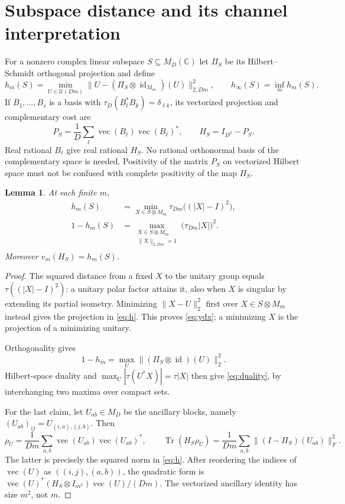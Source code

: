 \documentclass[11pt,a4paper]{article}
\newtheorem{lemma}[theorem]{Lemma}
\newcommand{\C}{\mathbb C}
\newcommand{\Tr}{\operatorname{Tr}}
\newcommand{\id}{\operatorname{id}}
\newcommand{\vecop}{\operatorname{vec}}
\newcommand{\norm}[1]{\lVert#1\rVert}
\begin{document}
\section{Subspace distance and its channel interpretation}
For a nonzero complex linear subspace $S\subseteq M_D(\C)$ let $\Pi_S$ be its Hilbert--Schmidt orthogonal projection and define
\begin{equation}
 h_m(S)=\min_{U\in\mathcal U(Dm)}
       \norm{U-(\Pi_S\otimes\id_{M_m})(U)}_{2,Dm}^2,
 \qquad h_\infty(S)=\inf_m h_m(S).                 \label{eq:h}
\end{equation}
If $B_1,\ldots,B_s$ is a basis with $\tau_D(B_\ell^*B_k)=\delta_{\ell k}$, its vectorized projection and complementary cost are
\begin{equation}
 P_S=\frac1D\sum_\ell\vecop(B_\ell)\vecop(B_\ell)^*,
 \qquad H_S=I_{D^2}-P_S.                           \label{eq:proj}
\end{equation}
Real rational $B_\ell$ give real rational $H_S$. No rational orthonormal basis of the complementary space is needed. Positivity of the matrix $P_S$ on vectorized Hilbert space must not be confused with complete positivity of the map $\Pi_S$.

\begin{lemma}\label{lem:duality}
At each finite $m$,
\begin{align}
 h_m(S)&=\min_{X\in S\otimes M_m}\tau_{Dm}\bigl((|X|-I)^2\bigr), \label{eq:ydx}\\
 1-h_m(S)&=
 \max_{\substack{X\in S\otimes M_m\\\norm X_{2,Dm}=1}}
                      \bigl(\tau_{Dm}|X|\bigr)^2.              \label{eq:duality}
\end{align}
Moreover $v_m(H_S)=h_m(S)$.
\end{lemma}
\begin{proof}
The squared distance from a fixed $X$ to the unitary group equals
$\tau((|X|-I)^2)$: a unitary polar factor attains it, also when $X$ is singular by extending its partial isometry. Minimizing $\norm{X-U}_2^2$ first over $X\in S\otimes M_m$ instead gives the projection in \eqref{eq:h}. This proves \eqref{eq:ydx}; a minimizing $X$ is the projection of a minimizing unitary.

Orthogonality gives
\[
 1-h_m=\max_U\norm{(\Pi_S\otimes\id)(U)}_2^2.
\]
Hilbert-space duality and $\max_U|\tau(U^*X)|=\tau|X|$ then give \eqref{eq:duality}, by interchanging two maxima over compact sets.

For the last claim, let $U_{ab}\in M_D$ be the ancillary blocks, namely
$(U_{ab})_{ij}=U_{(i,a),(j,b)}$. Then
\[
 \rho_U=\frac1{Dm}\sum_{a,b}\vecop(U_{ab})\vecop(U_{ab})^*,
 \qquad
 \Tr(H_S\rho_U)=\frac1{Dm}\sum_{a,b}
                 \norm{(I-\Pi_S)(U_{ab})}_{F}^2.
\]
The latter is precisely the squared norm in \eqref{eq:h}. After reordering the indices of $\vecop(U)$ as $((i,j),(a,b))$, the quadratic form is
$\vecop(U)^*(H_S\otimes I_{m^2})\vecop(U)/(Dm)$.
The vectorized ancillary identity has size $m^2$, not $m$.
\end{proof}
\end{document}
